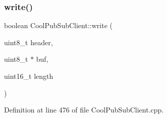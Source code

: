 \subsubsection{\texorpdfstring{write()}{write()}}
{\footnotesize\ttfamily boolean Cool\+Pub\+Sub\+Client\+::write (\begin{DoxyParamCaption}\item[{uint8\+\_\+t}]{header,  }\item[{uint8\+\_\+t $\ast$}]{buf,  }\item[{uint16\+\_\+t}]{length }\end{DoxyParamCaption})\hspace{0.3cm}{\ttfamily [private]}}



Definition at line 476 of file Cool\+Pub\+Sub\+Client.\+cpp.


